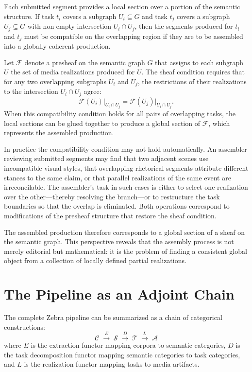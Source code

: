 \documentclass[12pt,a4paper]{article}
\begin{document}
Each submitted segment provides a local section over a portion of the semantic structure. If task $t_i$ covers a subgraph $U_i \subseteq G$ and task $t_j$ covers a subgraph $U_j \subseteq G$ with non-empty intersection $U_i \cap U_j$, then the segments produced for $t_i$ and $t_j$ must be compatible on the overlapping region if they are to be assembled into a globally coherent production.

Let $\mathcal{F}$ denote a presheaf on the semantic graph $G$ that assigns to each subgraph $U$ the set of media realizations produced for $U$. The sheaf condition requires that for any two overlapping subgraphs $U_i$ and $U_j$, the restrictions of their realizations to the intersection $U_i \cap U_j$ agree:
\[
\mathcal{F}(U_i)\big|_{U_i \cap U_j} = \mathcal{F}(U_j)\big|_{U_i \cap U_j}.
\]
When this compatibility condition holds for all pairs of overlapping tasks, the local sections can be glued together to produce a global section of $\mathcal{F}$, which represents the assembled production.

In practice the compatibility condition may not hold automatically. An assembler reviewing submitted segments may find that two adjacent scenes use incompatible visual styles, that overlapping rhetorical segments attribute different stances to the same claim, or that parallel realizations of the same event are irreconcilable. The assembler's task in such cases is either to select one realization over the other—thereby resolving the branch—or to restructure the task boundaries so that the overlap is eliminated. Both operations correspond to modifications of the presheaf structure that restore the sheaf condition.

The assembled production therefore corresponds to a global section of a sheaf on the semantic graph. This perspective reveals that the assembly process is not merely editorial but mathematical: it is the problem of finding a consistent global object from a collection of locally defined partial realizations.

\section{The Pipeline as an Adjoint Chain}

The complete Zebra pipeline can be summarized as a chain of categorical constructions:
\[
\mathcal{C}
\;\xrightarrow{E}\;
\mathcal{S}
\;\xrightarrow{D}\;
\mathcal{T}
\;\xrightarrow{L}\;
\mathcal{A}
\]
where $E$ is the extraction functor mapping corpora to semantic categories, $D$ is the task decomposition functor mapping semantic categories to task categories, and $L$ is the realization functor mapping tasks to media artifacts.
\end{document}
